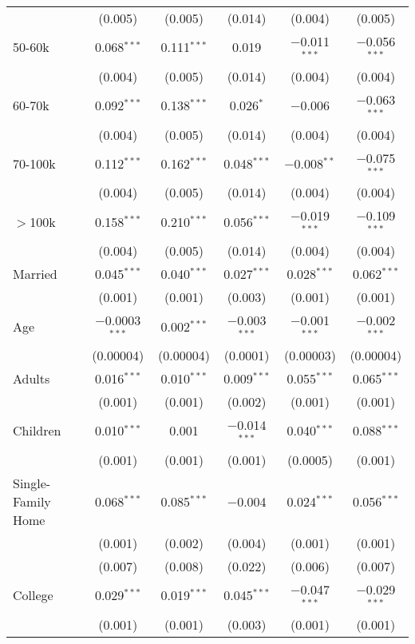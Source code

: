 \begin{table}[!htbp]
{\begin{tabular}{@{\extracolsep{5pt}}lccccc}
  & (0.005) & (0.005) & (0.014) & (0.004) & (0.005) \\
  50-60k & 0.068$^{***}$ & 0.111$^{***}$ & 0.019 & $-$0.011$^{***}$ & $-$0.056$^{***}$ \\
  & (0.004) & (0.005) & (0.014) & (0.004) & (0.004) \\
  60-70k & 0.092$^{***}$ & 0.138$^{***}$ & 0.026$^{*}$ & $-$0.006 & $-$0.063$^{***}$ \\
  & (0.004) & (0.005) & (0.014) & (0.004) & (0.004) \\
  70-100k & 0.112$^{***}$ & 0.162$^{***}$ & 0.048$^{***}$ & $-$0.008$^{**}$ & $-$0.075$^{***}$ \\
  & (0.004) & (0.005) & (0.014) & (0.004) & (0.004) \\
  $>$100k & 0.158$^{***}$ & 0.210$^{***}$ & 0.056$^{***}$ & $-$0.019$^{***}$ & $-$0.109$^{***}$ \\
  & (0.004) & (0.005) & (0.014) & (0.004) & (0.004) \\
  Married & 0.045$^{***}$ & 0.040$^{***}$ & 0.027$^{***}$ & 0.028$^{***}$ & 0.062$^{***}$ \\
  & (0.001) & (0.001) & (0.003) & (0.001) & (0.001) \\
  Age & $-$0.0003$^{***}$ & 0.002$^{***}$ & $-$0.003$^{***}$ & $-$0.001$^{***}$ & $-$0.002$^{***}$ \\
  & (0.00004) & (0.00004) & (0.0001) & (0.00003) & (0.00004) \\
  Adults & 0.016$^{***}$ & 0.010$^{***}$ & 0.009$^{***}$ & 0.055$^{***}$ & 0.065$^{***}$ \\
  & (0.001) & (0.001) & (0.002) & (0.001) & (0.001) \\
  Children & 0.010$^{***}$ & 0.001 & $-$0.014$^{***}$ & 0.040$^{***}$ & 0.088$^{***}$ \\
  & (0.001) & (0.001) & (0.001) & (0.0005) & (0.001) \\
  Single-Family Home & 0.068$^{***}$ & 0.085$^{***}$ & $-$0.004 & 0.024$^{***}$ & 0.056$^{***}$ \\
  & (0.001) & (0.002) & (0.004) & (0.001) & (0.001) \\
  & (0.007) & (0.008) & (0.022) & (0.006) & (0.007) \\
  College & 0.029$^{***}$ & 0.019$^{***}$ & 0.045$^{***}$ & $-$0.047$^{***}$ & $-$0.029$^{***}$ \\
  & (0.001) & (0.001) & (0.003) & (0.001) & (0.001) \\

\end{tabular}}
\end{table}
